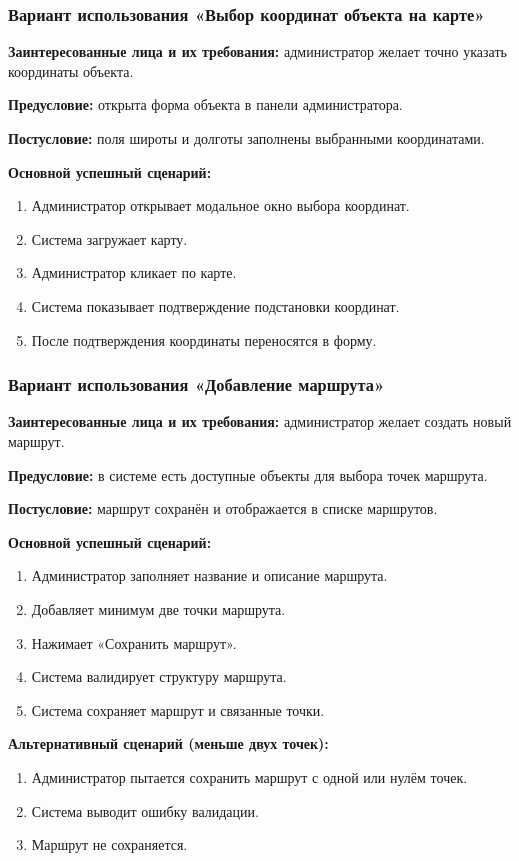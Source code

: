 \subsubsection{Вариант использования «Выбор координат объекта на карте»}
\textbf{Заинтересованные лица и их требования:} администратор желает точно указать координаты объекта.

\textbf{Предусловие:} открыта форма объекта в панели администратора.

\textbf{Постусловие:} поля широты и долготы заполнены выбранными координатами.

\textbf{Основной успешный сценарий:}
\begin{enumerate}
	\item Администратор открывает модальное окно выбора координат.
	\item Система загружает карту.
	\item Администратор кликает по карте.
	\item Система показывает подтверждение подстановки координат.
	\item После подтверждения координаты переносятся в форму.
\end{enumerate}

\subsubsection{Вариант использования «Добавление маршрута»}
\textbf{Заинтересованные лица и их требования:} администратор желает создать новый маршрут.

\textbf{Предусловие:} в системе есть доступные объекты для выбора точек маршрута.

\textbf{Постусловие:} маршрут сохранён и отображается в списке маршрутов.

\textbf{Основной успешный сценарий:}
\begin{enumerate}
	\item Администратор заполняет название и описание маршрута.
	\item Добавляет минимум две точки маршрута.
	\item Нажимает «Сохранить маршрут».
	\item Система валидирует структуру маршрута.
	\item Система сохраняет маршрут и связанные точки.
\end{enumerate}

\textbf{Альтернативный сценарий (меньше двух точек):} 
\begin{enumerate}
	\item Администратор пытается сохранить маршрут с одной или нулём точек.
	\item Система выводит ошибку валидации.
	\item Маршрут не сохраняется.
\end{enumerate}

